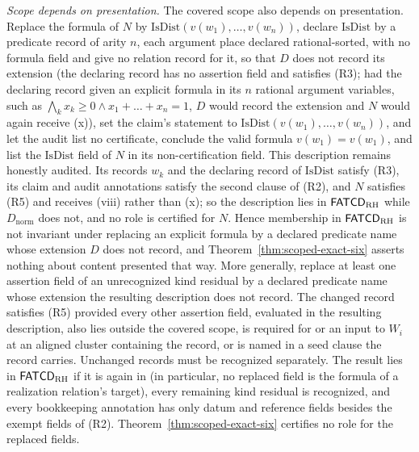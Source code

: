 \begin{remark}
\emph{Scope depends on presentation.} The covered scope also depends on presentation. Replace the formula of \(N\)
by \(\mathrm{IsDist}(v(w_1),\ldots,v(w_n))\), declare \(\mathrm{IsDist}\) by a
predicate record of arity \(n\), each argument place declared rational-sorted, with no formula field and give no relation
record for it, so that \(D\) does not record its extension (the declaring
record has no assertion field and satisfies (R3); had the declaring record
given an explicit formula in its \(n\) rational argument variables, such as \(\bigwedge_k x_k\ge0\wedge x_1+\dots+x_n=1\), \(D\) would record the extension and \(N\) would
again receive (x)), set the claim's statement
to \(\mathrm{IsDist}(v(w_1),\ldots,v(w_n))\), and let the audit list no certificate, conclude the valid formula
\(v(w_1)=v(w_1)\), and list the \(\mathrm{IsDist}\) field of \(N\) in its
non-certification field. This description remains honestly
audited. Its records \(w_k\) and the declaring record of \(\mathrm{IsDist}\)
satisfy (R3), its claim and audit annotations satisfy the second clause of
(R2), and \(N\) satisfies (R5) and receives (viii) rather than (x); so the
description lies in \(\mathsf{FATCD}_{\mathrm{RH}}\) while \(D_{\mathrm{norm}}\) does
not, and no role is certified for \(N\). Hence membership in \(\mathsf{FATCD}_{\mathrm{RH}}\) is not
invariant under replacing an explicit formula by a declared predicate name whose extension \(D\) does not record,
and Theorem~\ref{thm:scoped-exact-six} asserts nothing about content presented
that way. More generally, replace at least one assertion field of an unrecognized
kind residual by a declared predicate name whose extension the resulting
description does not record. The changed record satisfies (R5) provided every
other assertion field, evaluated in the resulting description, also lies
outside the covered scope, is required for or an input to \(W_i\) at an
aligned cluster containing the record, or is named in a seed clause the record
carries. Unchanged records must be recognized separately. The result lies in
\(\mathsf{FATCD}_{\mathrm{RH}}\) if it is again in \FATCD{} (in particular, no replaced field is the formula of a realization relation's target),
every remaining kind residual is recognized, and every bookkeeping annotation
has only datum and reference fields besides the exempt fields of (R2).
Theorem~\ref{thm:scoped-exact-six} certifies no role for the replaced
fields.


\end{remark}
